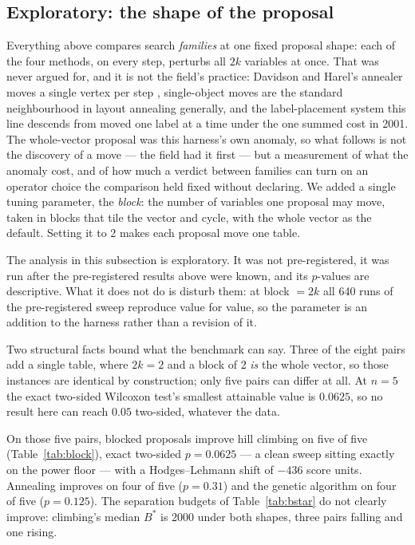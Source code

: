 \documentclass[11pt]{article}
\begin{document}
\subsection{Exploratory: the shape of the proposal}\label{sec:block}

Everything above compares search \emph{families} at one fixed proposal shape: each of the
four methods, on every step, perturbs all $2k$ variables at once. That was never argued for,
and it is not the field's practice: Davidson and Harel's annealer moves a single vertex per
step \cite{dh96}, single-object moves are the standard neighbourhood in layout annealing
generally, and the label-placement system this line descends from moved one label at a time
under the one summed cost in 2001. The whole-vector proposal was this harness's own anomaly,
so what follows is not the discovery of a move --- the field had it first --- but a
measurement of what the anomaly cost, and of how much a verdict between families can turn on
an operator choice the comparison held fixed without declaring. We added a single tuning
parameter, the \emph{block}: the number of variables one proposal may move, taken in blocks
that tile the vector and cycle, with the whole vector as the default. Setting it to 2 makes
each proposal move one table.

The analysis in this subsection is exploratory. It was not pre-registered, it was run after
the pre-registered results above were known, and its $p$-values are descriptive. What it does
not do is disturb them: at block $=2k$ all 640 runs of the pre-registered sweep reproduce
value for value, so the parameter is an addition to the harness rather than a revision of it.

Two structural facts bound what the benchmark can say. Three of the eight pairs add a single
table, where $2k = 2$ and a block of 2 \emph{is} the whole vector, so those instances are
identical by construction; only five pairs can differ at all. At $n = 5$ the exact two-sided
Wilcoxon test's smallest attainable value is $0.0625$, so no result here can reach $0.05$
two-sided, whatever the data.

On those five pairs, blocked proposals improve hill climbing on five of five
(Table~\ref{tab:block}), exact two-sided $p = 0.0625$ --- a clean sweep sitting exactly on
the power floor --- with a Hodges--Lehmann shift of $-436$ score units. Annealing improves on
four of five ($p = 0.31$) and the genetic algorithm on four of five ($p = 0.125$). The
separation budgets of Table~\ref{tab:bstar} do not clearly improve: climbing's median $B^{*}$
is 2000 under both shapes, three pairs falling and one rising.
\end{document}
